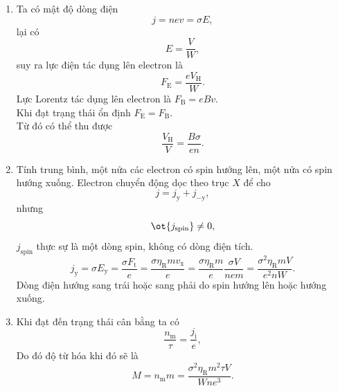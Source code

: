 \begin{loigiai}
\begin{enumerate}[1) ]
    \item
Ta có mật độ dòng điện
\[j=nev=\sigma E,\]
lại có
\[E=\dfrac{V}{W},\]
suy ra lực điện tác dụng lên electron là
\[F_{\mathrm{E}}=\dfrac{eV_{\mathrm{H}}}{W}.\]
Lực Lorentz tác dụng lên electron là $F_{\mathrm{B}}=eBv$.\\
Khi đạt trạng thái ổn định $F_{\mathrm{E}}=F_{\mathrm{B}}$.\\Từ đó có thể thu được
\[\dfrac{V_{\mathrm{H}}}{V}=\dfrac{B\sigma}{en}.\]
    \item Tính trung bình, một nửa các electron có spin hướng lên, một nửa có spin hướng xuống. Electron chuyển động dọc theo trục $X$ để cho
    \[j=j_{\mathrm{y}}+j_{-\mathrm{y}},\]
    nhưng
    \[\ot{j_{\mathrm{spin}}}\neq 0,\]
    $j_{\mathrm{spin}}$ thực sự là một dòng spin, không có dòng điện tích.
    \[j_{\mathrm{y}}=\sigma E_{\mathrm{y}}=\dfrac{\sigma F_{\mathrm{t}}}{e}=\dfrac{\sigma \eta_{\mathrm{R}}mv_{\mathrm{x}}}{e}=\dfrac{\sigma\eta_{\mathrm{R}}m}{e}\dfrac{\sigma V}{nem}=\dfrac{\sigma^2\eta_{\mathrm{R}}mV}{e^2nW}.\]
    Dòng điện hướng sang trái hoặc sang phải do spin hướng lên hoặc hướng xuống.
    \item Khi đạt đến trạng thái cân bằng ta có
    \[\dfrac{n_{\mathrm{m}}}{\tau}=\dfrac{j_{\mathrm{i}}}{e},\]
    Do đó độ từ hóa khi đó sẽ là
    \[M=n_{\mathrm{m}}m=\dfrac{\sigma^2\eta_{\mathrm{R}}m^2\tau V}{Wne^3}.\]
\end{enumerate}
\end{loigiai}

